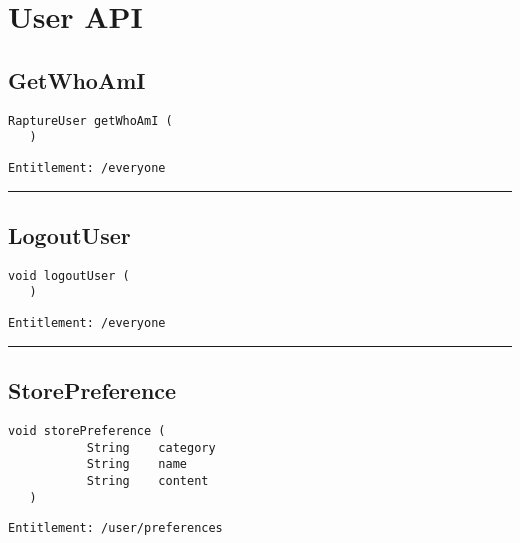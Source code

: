 \chapter{User API}

\section{GetWhoAmI}
\label{Api:GetWhoAmI}
\begin{lstlisting}[style=nonumbers]
   RaptureUser getWhoAmI (
   )
\end{lstlisting}
\begin{Verbatim}[formatcom=\color{Maroon}]
  Entitlement: /everyone
\end{Verbatim}



\rule{12cm}{2pt}
\section{LogoutUser}
\label{Api:LogoutUser}
\begin{lstlisting}[style=nonumbers]
   void logoutUser (
   )
\end{lstlisting}
\begin{Verbatim}[formatcom=\color{Maroon}]
  Entitlement: /everyone
\end{Verbatim}



\rule{12cm}{2pt}
\section{StorePreference}
\label{Api:StorePreference}
\begin{lstlisting}[style=nonumbers]
   void storePreference (
           String    category
           String    name
           String    content
   )
\end{lstlisting}
\begin{Verbatim}[formatcom=\color{Maroon}]
  Entitlement: /user/preferences
\end{Verbatim}



